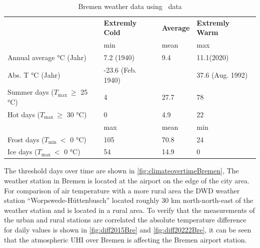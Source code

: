\documentclass[12pt,a4paper, english,twoside]{article}
\begin{document}
  \begin{table}[ht]
    \centering
    \caption{Bremen weather data using~\autocite{DWD2024a} data\label{tab:statsBremen}}
  \renewcommand{\arraystretch}{1.4}
    \begin{tabular}{p{3.5cm}p{2.5cm}lp{2.5cm}}
      \toprule
      & \textbf{Extremly Cold} & \textbf{Average} & \textbf{Extremly Warm} \\
      & min & mean & max \\
      \midrule
      Annual average °C \newline (Jahr)     &   7.2 \newline(1940)       & 9.4    & 11.1\newline (2020)      \\
      Abs. T °C \newline (Jahr)             & -23.6 \newline(Feb. 1940)  &        & 37.6 \newline(Aug. 1992) \\
      Summer days \newline($T_{\max}~\ge$  25 °C) & 4                    & 27.7   & 78 \\
      Hot days \newline($T_{\max}~\ge$  30 °C)    & 0                    & 4.9    & 22 \\
      \midrule
      & max & mean & min \\
      \midrule
      Frost days \newline($T_{\min}~<$  0 °C)     & 105         & 70.8   & 24 \\
      Ice days \newline($T_{\max}~<$  0 °C)       & 54          & 14.9   & 0  \\
      \bottomrule
    \end{tabular}
  \end{table}
%
   The threshold days over time are shown in \cref{fig:climateovertimeBremen},
   The weather station in Bremen is located at the airport on the edge of the city area. %
   For comparison of air temperature with a more rural area the \gls{DWD} weather station ``Worpswede-Hüttenbusch'' located roughly 30 km north-north-east of the weather station and is located in a rural area. 
   To verify that the measurements of the urban and rural stations are correlated the absolute temperature difference for daily values is shown in \cref{fig:diff2015Bre} and \cref{fig:diff20222Bre}, it can be seen that the atmospheric \gls{UHI} over Bremen is affecting the Bremen airport station. 
\end{document}
